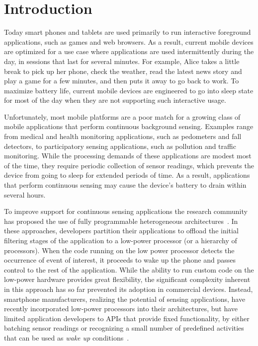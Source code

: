 
\section{\label{sec:Introduction}Introduction}

Today smart phones and tablets are used primarily to run interactive
foreground applications, such as games and web browsers.  As a result,
current mobile devices are optimized for a use case where applications
are used intermittently during the day, in sessions that last for
several minutes.  For example, Alice takes a little break to pick up
her phone, check the weather, read the latest news story and play a
game for a few minutes, and then puts it away to go back to work.  To
maximize battery life, current mobile devices are engineered to go
into sleep state for most of the day when they are not supporting
such interactive usage.

Unfortunately, most mobile platforms are a poor match for a growing
class of mobile applications that perform continuous background
sensing.  Examples range from medical and health monitoring
applications, such as pedometers and fall detectors, to participatory
sensing applications, such as pollution and traffic monitoring.  While
the processing demands of these applications are modest most of the
time, they require periodic collection of sensor readings, which
prevents the device from going to sleep for extended periods of time.
As a result, applications that perform continuous sensing may cause
the device's battery to drain within several hours.

To improve support for continuous sensing applications the research
community has proposed the use of fully programmable heterogeneous
architectures~\cite{reflex}.  In these approaches, developers
partition their applications to offload the initial filtering stages
of the application to a low-power processor (or a hierarchy of
processors).  When the code running on the low power processor detects
the occurrence of event of interest, it proceeds to wake up the phone
and passes control to the rest of the application.  While the ability
to run custom code on the low-power hardware provides great
flexibility, the significant complexity inherent in this approach has
so far prevented its adoption in commercial devices.  Instead,
smartphone manufacturers, realizing the potential of sensing
applications, have recently incorporated low-power processors into
their architectures, but have limited application developers to APIs
that provide fixed functionality, by either batching sensor readings
or recognizing a small number of predefined activities that can be
used as {\em wake up} conditions~\cite{android4.4,motox,nexus5}.

